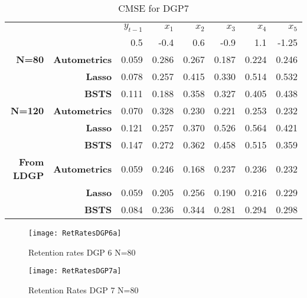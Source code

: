 \documentclass[11pt, oneside]{book}   	%
\begin{document}
\begin{table}[htbp]
  \centering

    \begin{tabular}{rrrrrrrr}

          &       & $y_{t-1}$ & $x_{1}$ & $x_{2}$ & $x_{3}$ & $x_{4}$ & $x_{5}$ \\

     &     & 0.5 & -0.4&0.6 &-0.9&1.1  &-1.25  \\
    \textbf{N=80} & \textbf{Autometrics} & 0.059 & 0.286 & 0.267 & 0.187 & 0.224 & 0.246 \\
    \textbf{} & \textbf{Lasso} & 0.078 & 0.257 & 0.415 & 0.330 & 0.514 & 0.532 \\
    \textbf{} & \textbf{BSTS} & 0.111 & 0.188 & 0.358 & 0.327 & 0.405 & 0.438 \\
    \textbf{N=120} & \textbf{Autometrics} & 0.070 & 0.328 & 0.230 & 0.221 & 0.253 & 0.232 \\
    \textbf{} & \textbf{Lasso} & 0.121 & 0.257 & 0.370 & 0.526 & 0.564 & 0.421 \\
    \textbf{} & \textbf{BSTS} & 0.147 & 0.272 & 0.362 & 0.458 & 0.515 & 0.359 \\
    \textbf{From LDGP} & \textbf{Autometrics} & 0.059 & 0.246 & 0.168 & 0.237 & 0.236 & 0.232 \\
          & \textbf{Lasso} & 0.059 & 0.205 & 0.256 & 0.190 & 0.216 & 0.229 \\
          & \textbf{BSTS} & 0.084 & 0.236 & 0.344 & 0.281 & 0.294 & 0.298 \\

    \end{tabular}%
      \caption{CMSE for DGP7}
  \label{DGP7CMSE}%
\end{table}%













\begin{figure}[h]

\begin{minipage}{.5\textwidth}
\centering
\texttt{[image: RetRatesDGP6a]}
\caption{Retention rates DGP 6 \newline N=80}
\label{fig:RetRatesDGP6a}
\end{minipage}%
\begin{minipage}{.5\textwidth}
\centering
\texttt{[image: RetRatesDGP7a]}
\caption{Retention Rates DGP 7 \newline N=80}
\label{fig:RetRatesDGP7a}

\end{minipage}

\end{figure}
\end{document}
